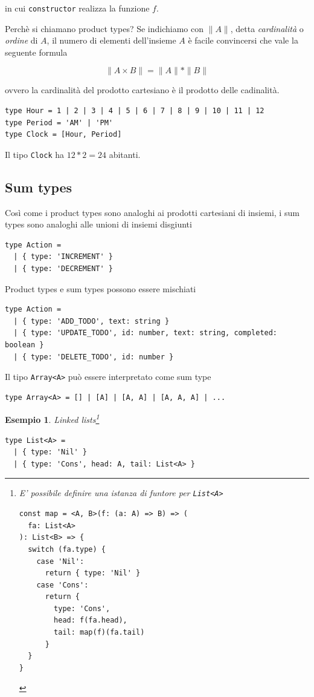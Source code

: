 \documentclass[12pt]{article}
\newtheorem{example}{Esempio}[section]
\begin{document}
in cui \texttt{constructor} realizza la funzione $f$.

Perchè si chiamano product types? Se indichiamo con $\|A\|$, detta \emph{cardinalità} o \emph{ordine} di $A$, il numero di elementi
dell'insieme $A$ è facile convincersi che vale la seguente formula

$$
\|A \times B\| = \|A\| * \|B\|
$$

ovvero la cardinalità del prodotto cartesiano è il prodotto delle cadinalità.

\begin{verbatim}
type Hour = 1 | 2 | 3 | 4 | 5 | 6 | 7 | 8 | 9 | 10 | 11 | 12
type Period = 'AM' | 'PM'
type Clock = [Hour, Period]
\end{verbatim}

Il tipo \texttt{Clock} ha $12 * 2 = 24$ abitanti.

\subsection{Sum types}

Così come i product types sono analoghi ai prodotti cartesiani di insiemi, i sum types sono analoghi alle unioni di insiemi disgiunti

\begin{verbatim}
type Action =
  | { type: 'INCREMENT' }
  | { type: 'DECREMENT' }
\end{verbatim}

Product types e sum types possono essere mischiati

\begin{verbatim}
type Action =
  | { type: 'ADD_TODO', text: string }
  | { type: 'UPDATE_TODO', id: number, text: string, completed: boolean }
  | { type: 'DELETE_TODO', id: number }
\end{verbatim}

Il tipo \texttt{Array<A>} può essere interpretato come sum type

\begin{verbatim}
type Array<A> = [] | [A] | [A, A] | [A, A, A] | ...
\end{verbatim}

\begin{example}
Linked lists\footnote{E' possibile definire una istanza di funtore per \texttt{List<A>}

\begin{verbatim}
const map = <A, B>(f: (a: A) => B) => (
  fa: List<A>
): List<B> => {
  switch (fa.type) {
    case 'Nil':
      return { type: 'Nil' }
    case 'Cons':
      return {
        type: 'Cons',
        head: f(fa.head),
        tail: map(f)(fa.tail)
      }
  }
}
\end{verbatim}
}

\begin{verbatim}
type List<A> =
  | { type: 'Nil' }
  | { type: 'Cons', head: A, tail: List<A> }
\end{verbatim}
\end{example}
\end{document}
